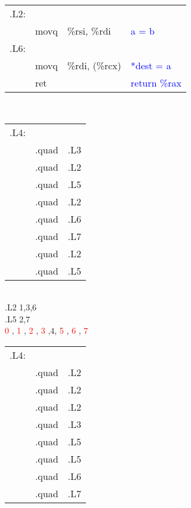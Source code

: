 \documentclass{article}
\newcommand{\blue}[1]{\textcolor{blue}{#1}}
\newcommand{\red}[1]{\textcolor{red}{#1}}
\begin{document}
\begin{CJK}{UTF8}{gbsn}
\begin{table}[ht]
\begin{tabular}{m{2em}m{3em}m{8em}l}
.L2:	&			&			&	\blue{}	\\
	&	movq		&	\%rsi, \%rdi	&	\blue{a = b}	\\
.L6:	&			&			&	\blue{}	\\
	&	movq		&	\%rdi, (\%rcx)	&	\blue{*dest = a}	\\
	&	ret		&			&	\blue{return \%rax}	\\
\end{tabular}
\end{table}	\\[-2ex]
\begin{table}[ht]
\begin{tabular}{m{2em}m{3em}m{8em}l}
.L4:	\\
	&	\multicolumn{2}{l}{.quad}	&	.L3	\\
	&	\multicolumn{2}{l}{.quad}	&	.L2	\\
	&	\multicolumn{2}{l}{.quad}	&	.L5	\\
	&	\multicolumn{2}{l}{.quad}	&	.L2	\\
	&	\multicolumn{2}{l}{.quad}	&	.L6	\\
	&	\multicolumn{2}{l}{.quad}	&	.L7	\\
	&	\multicolumn{2}{l}{.quad}	&	.L2	\\
	&	\multicolumn{2}{l}{.quad}	&	.L5	\\
\end{tabular}
\end{table}	\\[-2ex]
.L2 1,3,6	\\
.L5 2,7		\\
\red{ 0 },\red{ 1 },\red{ 2 },\red{ 3 },4,\red{ 5 },\red{ 6 },\red{ 7 }
\newpage
\begin{table}[ht]
\begin{tabular}{m{2em}m{3em}m{8em}l}
.L4:	\\
	&	\multicolumn{2}{l}{.quad}	&	.L2	\\
	&	\multicolumn{2}{l}{.quad}	&	.L2	\\
	&	\multicolumn{2}{l}{.quad}	&	.L2	\\
	&	\multicolumn{2}{l}{.quad}	&	.L3	\\
	&	\multicolumn{2}{l}{.quad}	&	.L5	\\
	&	\multicolumn{2}{l}{.quad}	&	.L5	\\
	&	\multicolumn{2}{l}{.quad}	&	.L6	\\
	&	\multicolumn{2}{l}{.quad}	&	.L7	\\
\end{tabular}
\end{table}	

\end{CJK}
\end{document}
